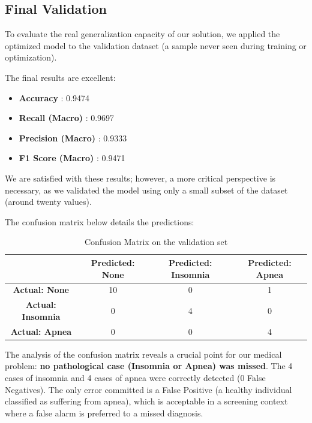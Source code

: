 \documentclass[12pt,a4paper]{article}
\begin{document}
    \subsection{Final Validation}
    To evaluate the real generalization capacity of our solution, we applied the optimized model to the validation dataset (a sample never seen during training or optimization).

    The final results are excellent:
    \begin{itemize}
        \item \textbf{Accuracy} : 0.9474
        \item \textbf{Recall (Macro)} : 0.9697
        \item \textbf{Precision (Macro)} : 0.9333
        \item \textbf{F1 Score (Macro)} : 0.9471
    \end{itemize}

    We are satisfied with these results; however, a more critical perspective is necessary, as we validated the model using only a small subset of the dataset (around twenty values).

    The confusion matrix below details the predictions:

    \begin{table}[H]
        \centering
        \begin{tabular}{|c|c|c|c|}
            \hline
             & \textbf{Predicted: None} & \textbf{Predicted: Insomnia} & \textbf{Predicted: Apnea} \\
            \hline
            \textbf{Actual: None} & 10 & 0 & 1 \\
            \hline
            \textbf{Actual: Insomnia} & 0 & 4 & 0 \\
            \hline
            \textbf{Actual: Apnea} & 0 & 0 & 4 \\
            \hline
        \end{tabular}
        \caption{Confusion Matrix on the validation set}
        \label{tab:final_confusion}
    \end{table}

    The analysis of the confusion matrix reveals a crucial point for our medical problem: \textbf{no pathological case (Insomnia or Apnea) was missed}. The 4 cases of insomnia and 4 cases of apnea were correctly detected (0 False Negatives). The only error committed is a False Positive (a healthy individual classified as suffering from apnea), which is acceptable in a screening context where a false alarm is preferred to a missed diagnosis.
\end{document}
